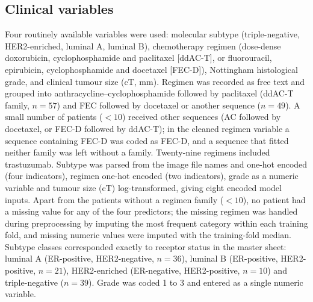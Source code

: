 \documentclass[10pt,a4paper,twocolumn]{article}
\begin{document}
\subsection{Clinical variables}
Four routinely available variables were used: molecular subtype (triple-negative, HER2-enriched, luminal A, luminal B), chemotherapy regimen (dose-dense doxorubicin, cyclophosphamide and paclitaxel [ddAC-T], or fluorouracil, epirubicin, cyclophosphamide and docetaxel [FEC-D]), Nottingham histological grade, and clinical tumour size (cT, mm). Regimen was recorded as free text and grouped into anthracycline--cyclophosphamide followed by paclitaxel (ddAC-T family, $n = 57$) and FEC followed by docetaxel or another sequence ($n = 49$). A small number of patients ($<10$) received other sequences (AC followed by docetaxel, or FEC-D followed by ddAC-T); in the cleaned regimen variable a sequence containing FEC-D was coded as FEC-D, and a sequence that fitted neither family was left without a family. Twenty-nine regimens included trastuzumab. Subtype was parsed from the image file names and one-hot encoded (four indicators), regimen one-hot encoded (two indicators), grade as a numeric variable and tumour size (cT) log-transformed, giving eight encoded model inputs. Apart from the patients without a regimen family ($<10$), no patient had a missing value for any of the four predictors; the missing regimen was handled during preprocessing by imputing the most frequent category within each training fold, and missing numeric values were imputed with the training-fold median. Subtype classes corresponded exactly to receptor status in the master sheet: luminal A (ER-positive, HER2-negative, $n = 36$), luminal B (ER-positive, HER2-positive, $n = 21$), HER2-enriched (ER-negative, HER2-positive, $n = 10$) and triple-negative ($n = 39$). Grade was coded 1 to 3 and entered as a single numeric variable.
\end{document}
